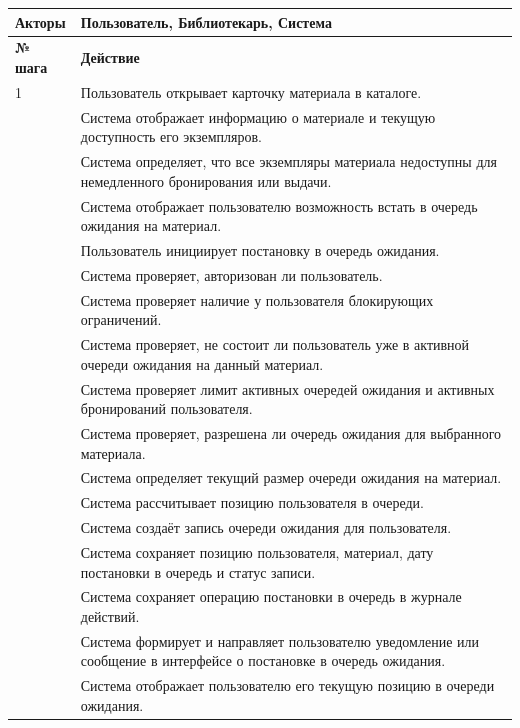 \documentclass[12pt,a4paper]{article}
\begin{document}
\begin{xltabular}{\textwidth}{
				|>{\raggedright\arraybackslash}p{2.7cm}
				|>{\raggedright\arraybackslash}X|
			}
			\textbf{Акторы} &
			Пользователь, Библиотекарь, Система \\
			\hline
			
			
			\textbf{№ шага} & \textbf{Действие} \\
			\hline
			
			1 & Пользователь открывает карточку материала в каталоге. \\
			 & Система отображает информацию о материале и текущую доступность
			его экземпляров. \\
			 & Система определяет, что все экземпляры материала недоступны для
			немедленного бронирования или выдачи. \\
			 & Система отображает пользователю возможность встать в очередь
			ожидания на материал. \\
			 & Пользователь инициирует постановку в очередь ожидания. \\
			 & Система проверяет, авторизован ли пользователь. \\
			 & Система проверяет наличие у пользователя блокирующих ограничений. \\
			 & Система проверяет, не состоит ли пользователь уже в активной очереди
			ожидания на данный материал. \\
			 & Система проверяет лимит активных очередей ожидания и активных
			бронирований пользователя. \\
			 & Система проверяет, разрешена ли очередь ожидания для выбранного
			материала. \\
			 & Система определяет текущий размер очереди ожидания на материал. \\
			 & Система рассчитывает позицию пользователя в очереди. \\
			 & Система создаёт запись очереди ожидания для пользователя. \\
			 & Система сохраняет позицию пользователя, материал, дату постановки
			в очередь и статус записи. \\
			 & Система сохраняет операцию постановки в очередь в журнале действий. \\
			 & Система формирует и направляет пользователю уведомление или
			сообщение в интерфейсе о постановке в очередь ожидания. \\
			 & Система отображает пользователю его текущую позицию в очереди
			ожидания. \\
			\hline
			

\end{xltabular}
\end{document}
